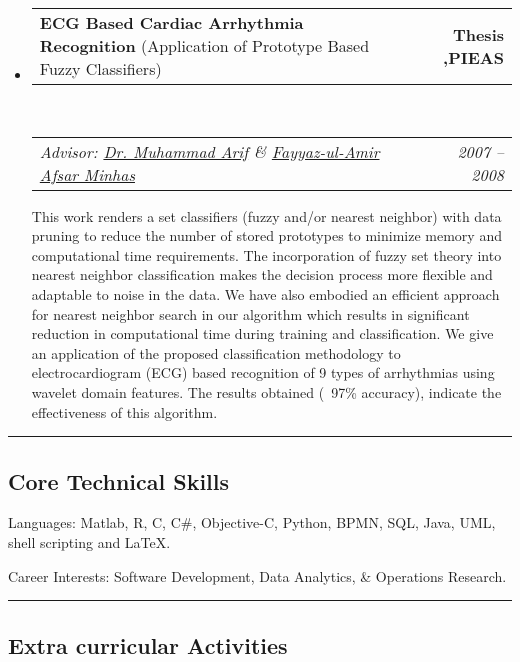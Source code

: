 \documentclass[10pt,letterpaper]{article}
\makeatletter
\newenvironment{indentsection}[1]%
{\begin{list}{}%
	{\setlength{\leftmargin}{#1}}%
	\item[]%
}
{\end{list}}
\newcommand{\headerrow}[2]
{\begin{tabular*}{\linewidth}{l@{\extracolsep{\fill}}r}
	#1 &
	#2 \\
\end{tabular*}}
\newcommand{\CPP}
{C\nolinebreak[4]\hspace{-.05em}\raisebox{.22ex}{\footnotesize\bf ++}}
\makeatother
\begin{document}
\begin{itemize}
	\item
	\headerrow
        {\textbf{ECG Based Cardiac Arrhythmia Recognition} (\small Application of Prototype Based Fuzzy Classifiers)}
		{\textbf{Thesis ,PIEAS}}
	\\
	\headerrow
        {\emph{Advisor: \href{http://syedmarif.webnode.com/}{Dr. Muhammad Arif} \&
            \href{https://sites.google.com/site/fayyazafsar/home}{Fayyaz-ul-Amir Afsar Minhas}
        }}
        {\emph{2007 -- 2008}}
	\begin{itemize*}
        This work renders a set classifiers (fuzzy and/or nearest neighbor) with data pruning to reduce the number of stored prototypes to minimize memory and computational time requirements. The incorporation of fuzzy set theory into nearest neighbor classification makes the decision process more flexible and adaptable to noise in the data. We have also embodied an efficient approach for nearest neighbor search in our algorithm which results in significant reduction in computational time during training and classification. We give an application of the proposed classification methodology to electrocardiogram (ECG) based recognition of 9 types of arrhythmias using wavelet domain features.  The results obtained (~97\% accuracy), indicate the effectiveness of this algorithm.
	\end{itemize*}
\end{itemize}

\hrule
\vspace{-0.4em}
\subsection*{Core Technical Skills}

\begin{indentsection}{\parindent}
\begin{description*}
	\item[Languages:]
	 Matlab, R, \CPP, C\#, Objective-C, Python, BPMN, SQL, Java, UML, shell scripting and \LaTeX.
	\item[Career Interests:]
	 Software Development, Data Analytics, \& Operations Research.
\end{description*}
\end{indentsection}

\hrule
\vspace{-0.4em}
\subsection*{Extra curricular Activities}
\end{document}
